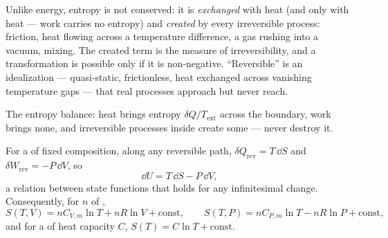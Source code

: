 \begin{remark}\label{rem:b1:second-law-entropy:reading}
Unlike energy, entropy is not conserved: it is \emph{exchanged} with heat
(and only with heat --- work carries no entropy) and \emph{created} by
every irreversible process: friction, heat flowing across a temperature
difference, a gas rushing into a vacuum, mixing. The created term is
the measure of irreversibility, and a transformation is possible only if
it is non-negative. ``Reversible'' is an idealization --- quasi-static,
frictionless, heat exchanged across vanishing temperature gaps --- that
real processes approach but never reach.
\end{remark}

\begin{omfigure}

{\small The entropy balance: heat brings entropy $\delta Q/T_{\mathrm{ext}}$
across the boundary, work brings none, and irreversible processes inside
create some --- never destroy it.}
\end{omfigure}

\begin{proposition}\label{prop:b1:second-law-entropy:identity}
For a  of fixed composition, along any reversible path,
$\delta Q_{\mathrm{rev}} = T\,\dd S$ and $\delta W_{\mathrm{rev}} = -P\,\dd V$, so
\[
\dd U = T\,\dd S - P\,\dd V ,
\]
a relation between state functions that holds for any infinitesimal
change. Consequently, for $n$  of ,
\[
S(T, V) = nC_{V,m}\ln T + nR\ln V + \text{const}, \qquad
S(T, P) = nC_{P,m}\ln T - nR\ln P + \text{const},
\]
and for a  of heat capacity $C$, $S(T) = C\ln T + \text{const}$.
\end{proposition}

